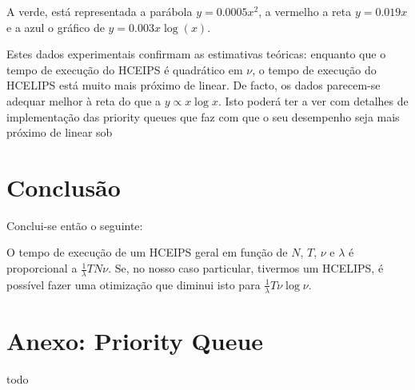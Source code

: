 \documentclass{article}
\begin{document}
	A verde, está representada a parábola $y = 0.0005 x^2$, a vermelho a reta $y = 0.019 x$  e a azul o gráfico de $y = 0.003 x \log(x)$.
	
	Estes dados experimentais confirmam as estimativas teóricas: enquanto que o tempo de execução do HCEIPS é quadrático em $\nu$, o tempo de execução do HCELIPS está muito mais próximo de linear. De facto, os dados parecem-se adequar melhor à reta do que a $y \propto x \log x$. Isto poderá ter a ver com detalhes de implementação das priority queues que faz com que o seu desempenho seja mais próximo de linear sob 
	
	\section{Conclusão}
	
	Conclui-se então o seguinte:
	
	O tempo de execução de um HCEIPS geral em função de $N$, $T$, $\nu$ e $\lambda$ é proporcional a $\frac 1 \lambda T N \nu$. Se, no nosso caso particular, tivermos um HCELIPS, é possível fazer uma otimização que diminui isto para $\frac 1 \lambda T \nu \log \nu$.
	
	\section{Anexo: Priority Queue}
	
	todo
\end{document}
